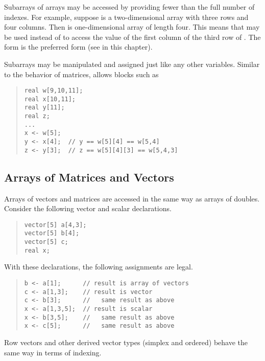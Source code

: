 Subarrays of arrays may be accessed by providing fewer than the full
number of indexes.  For example, suppose  is a two-dimensional
array with three rows and four columns.  Then  is
one-dimensional array of length four.  This means that 
may be used instead of  to access the value of the first
column of the third row of .  The form  is the
preferred form (see  in this chapter).

Subarrays may be manipulated and assigned just like any other
variables.  Similar to the behavior of matrices, \Stan allows blocks
such as 
%
\begin{quote}
\begin{Verbatim} 
real w[9,10,11];
real x[10,11];
real y[11];
real z;
...
x <- w[5];
y <- x[4];  // y == w[5][4] == w[5,4]
z <- y[3];  // z == w[5][4][3] == w[5,4,3]
\end{Verbatim}
\end{quote}
%


\subsection{Arrays of Matrices and Vectors}

Arrays of vectors and matrices are accessed in the same way as arrays
of doubles.  Consider the following vector and scalar declarations.
%
\begin{quote}
\begin{Verbatim}[fontsize=\small]
vector[5] a[4,3];
vector[5] b[4];
vector[5] c;
real x;
\end{Verbatim}
\end{quote}
%
With these declarations, the following assignments are legal.
%
\begin{quote}
\begin{Verbatim}[fontsize=\small]
b <- a[1];      // result is array of vectors
c <- a[1,3];    // result is vector
c <- b[3];      //   same result as above
x <- a[1,3,5];  // result is scalar
x <- b[3,5];    //   same result as above
x <- c[5];      //   same result as above
\end{Verbatim}
\end{quote}
%
Row vectors and other derived vector types (simplex and ordered)
behave the same way in terms of indexing.

